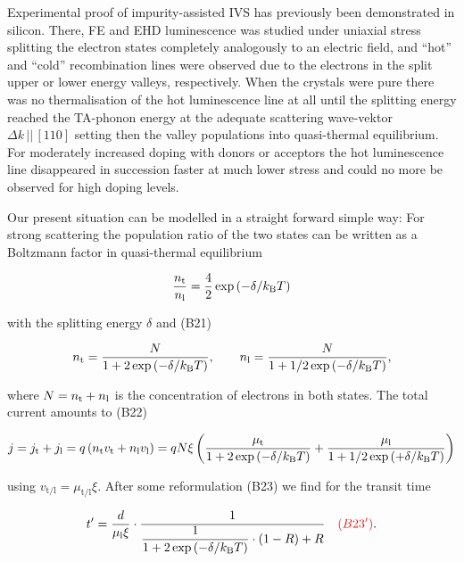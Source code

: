 Experimental proof of impurity-assisted IVS has previously been demonstrated in silicon. 
There, FE and EHD luminescence was studied under uniaxial stress splitting the electron states completely analogously to an electric field,
 and “hot” and “cold” recombination lines were observed due to the electrons in the split upper or lower energy valleys, respectively. 
When the crystals were pure there was no thermalisation of the hot luminescence line at all until the splitting energy reached the TA-phonon energy
 at the adequate scattering wave-vektor $\Delta k\,||\, [110]$ setting then the valley populations into quasi-thermal equilibrium. 
For moderately increased doping with donors or acceptors the hot luminescence line disappeared in succession faster at much lower stress and could no more be observed for high doping levels.

Our present situation can be modelled in a straight forward simple way:  
For strong scattering the population ratio of the two states can be written as a Boltzmann factor in quasi-thermal equilibrium
 
\begin{equation}
 \frac{n_{\textrm{t}}}{n_{\textrm{l}}} = \frac{4}{2}\exp{(-\delta/k_{\textrm{B}}T)}
\end{equation}

\noindent
with the splitting energy $\delta$ and {\color{red}(B21)}

\begin{equation}
 n_{\textrm{t}} = \frac{N}{1+2\exp{(-\delta/k_{\textrm{B}}T)}}, \qquad  n_{\textrm{l}} = \frac{N}{1+1/2\exp{(-\delta/k_{\textrm{B}}T)}},
\end{equation}

\noindent
where $N = n_{\textrm{t}} + n_{\textrm{l}}$ is the concentration of electrons in both states. 
The total current amounts to  {\color{red}(B22)}

\begin{equation}
 j = j_{\textrm{t}} + j_{\textrm{l}} = \mathnormal{q}\left( n_{\textrm{t}} v_{\textrm{t}} + n_{\textrm{l}} v_{\textrm{l}} \right) = \mathnormal{q} N \xi \left( \frac{\mu_{\textrm{t}}}{1+2\exp{(-\delta/k_{\textrm{B}}T)}}  + \frac{\mu_{\textrm{l}}}{1+1/2\exp{(+\delta/k_{\textrm{B}}T)}}\right) 
\end{equation}

\noindent
using $v_{\textrm{t/l}} = \mu_{\textrm{t/l}}\xi$. 
After some reformulation {\color{red}(B23)} we find for the transit time

\begin{equation}
 t' = \frac{d}{\mu_{\textrm{l}}\xi}\cdot \frac{1}{ \dfrac{1}{1+2\exp{(-\delta/k_{\textrm{B}}T)}}\cdot(1-R) + R} \quad {\color{red}(B23')}.
 \label{math:tprime}
\end{equation}

